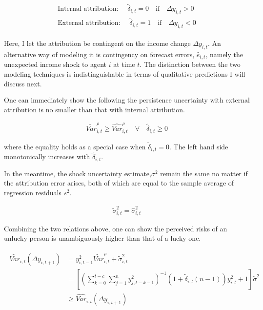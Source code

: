\documentclass[12pt,notitlepage,onecolumn,aps,pra]{article}
\begin{document}
\begin{eqnarray}
\begin{split}
\textrm{Internal attribution: }\quad \tilde\delta_{i,t} = 0 \quad \textrm{if} \quad \Delta y_{i,t}>0 \\
\textrm{External attribution: }\quad \tilde\delta_{i,t} = 1 \quad \textrm{if} \quad \Delta y_{i,t}<0
\end{split}
\end{eqnarray}

Here, I let the attribution be contingent on the income change
\(\Delta y_{i,t}\). An alternative way of modeling it is contingency on
forecast errors, \(\widehat e_{i,t}\), namely the unexpected income
shock to agent \(i\) at time \(t\). The distinction between the two
modeling techniques is indistinguishable in terms of qualitative
predictions I will discuss next.

One can immediately show the following the persistence uncertainty with
external attribution is no smaller than that with internal attribution.

\begin{eqnarray}
\tilde {Var}^{\rho}_{i,t} \geq \widehat {Var}^{\rho}_{i,t} \quad \forall \quad \tilde\delta_{i,t} \geq 0
\end{eqnarray}

where the equality holds as a special case when
\(\tilde\delta_{i,t} = 0\). The left hand side monotonically increases
with \(\tilde \delta_{i,t}\).

In the meantime, the shock uncertainty estimate,\(\sigma^2\) remain the
same no matter if the attribution error arises, both of which are equal
to the sample average of regression residuals \(s^2\).

\begin{eqnarray}
\tilde{\sigma}^2_{i,t} = \widehat{\sigma}^2_{i,t}
\end{eqnarray}

Combining the two relations above, one can show the perceived risks of
an unlucky person is unambiguously higher than that of a lucky one.

\begin{eqnarray}
\begin{split}
\tilde {Var}_{i,t}(\Delta y_{i,t+1}) & = y_{i,t-1}^2 \tilde{Var}^{\rho}_{i,t} + \tilde{\sigma}^2_{i,t} \\
& = [(\sum^{t-c}_{k=0}\sum^{n}_{j=1}y^2_{j,t-k-1})^{-1}(1+ \tilde\delta_{i,t}(n-1))y^2_{i,t} + 1] \tilde{\sigma}^2\\
& \geq \widehat {Var}_{i,t}(\Delta y_{i,t+1}) 
\end{split}
\end{eqnarray}
\end{document}
